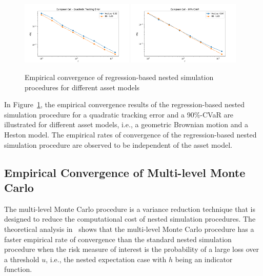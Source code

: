 \begin{figure}[ht!] 
    \centering
    \includegraphics[width=0.48\textwidth]{./project1/figures/figure10a.png}
    \includegraphics[width=0.48\textwidth]{./project1/figures/figure10b.png}
    \caption{Empirical convergence of regression-based nested simulation procedures for different asset models}
    \label{fig1:sens_model}
\end{figure}

In Figure~\ref{fig1:sens_model}, the empirical convergence results of the regression-based nested simulation procedure for a quadratic tracking error and a 90\%-CVaR are illustrated for different asset models, i.e., a geometric Brownian motion and a Heston model.
The empirical rates of convergence of the regression-based nested simulation procedure are observed to be independent of the asset model.

\subsection{Empirical Convergence of Multi-level Monte Carlo} \label{sec1:empirical-mlmc}

The multi-level Monte Carlo procedure is a variance reduction technique that is designed to reduce the computational cost of nested simulation procedures.
The theoretical analysis in~\cite{giles2019multilevel} shows that the multi-level Monte Carlo procedure has a faster empirical rate of convergence than the standard nested simulation procedure when the risk measure of interest is the probability of a large loss over a threshold $u$, i.e., the nested expectation case with $h$ being an indicator function.

